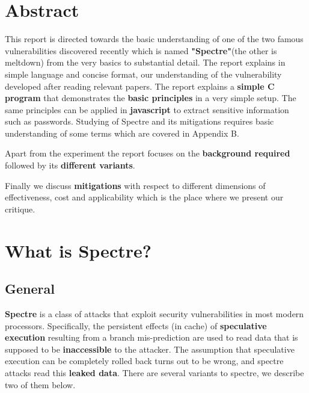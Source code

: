 \documentclass[12pt]{article}
\begin{document}

\tableofcontents
\pagebreak


\section{Abstract}
This report is directed towards the basic understanding of one of the two famous vulnerabilities discovered recently which is named \textbf{"Spectre"}(the other is meltdown) from the very basics to substantial detail. The report explains in simple language and concise format, our understanding of the vulnerability developed after reading relevant papers.  The report explains a \textbf{simple C program} that demonstrates the \textbf{basic principles} in a very simple setup. The same principles can be applied in \textbf{javascript} to extract sensitive information such as passwords. Studying of Spectre and its mitigations requires basic understanding of some terms which are covered in Appendix B.

Apart from the experiment the report focuses on the \textbf{background required} followed by its \textbf{different variants}.

Finally we discuss \textbf{mitigations} with respect to different dimensions of effectiveness, cost and applicability which is the place where we present our critique.
%
%
\section{What is Spectre?}
\subsection{General}
    \textbf{Spectre} is a class of attacks that exploit security vulnerabilities in most modern processors. Specifically, the persistent effects (in cache) of \textbf{speculative execution} resulting from a branch mis-prediction are used to read data that is supposed to be \textbf{inaccessible} to the attacker. The assumption that speculative execution can be completely rolled back turns out to be wrong, and spectre attacks read this \textbf{leaked data}. There are several variants to spectre, we describe two of them below.
\end{document}
